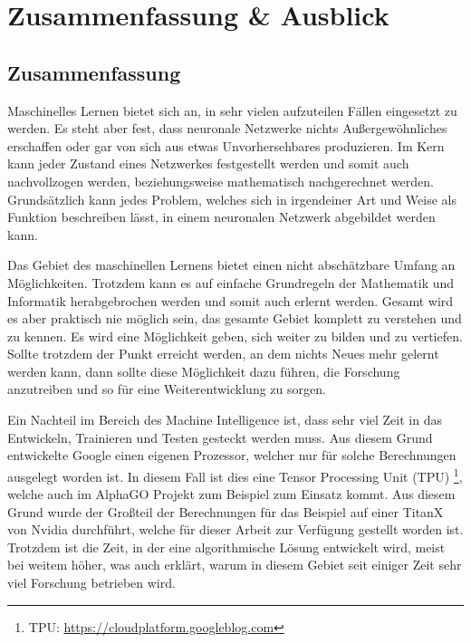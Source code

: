 \chapter{Zusammenfassung \& Ausblick}
\label{cha:ZusammenfassungAusblick}

\section{Zusammenfassung}

\noindent
Maschinelles Lernen bietet sich an, in sehr vielen aufzuteilen Fällen eingesetzt zu werden. 
Es steht aber fest, dass neuronale Netzwerke nichts Außergewöhnliches erschaffen oder gar von sich aus etwas Unvorhersehbares produzieren. 
Im Kern kann jeder Zustand eines Netzwerkes festgestellt werden und somit auch nachvollzogen werden, beziehungsweise mathematisch nachgerechnet werden. 
Grundsätzlich kann jedes Problem, welches sich in irgendeiner Art und Weise als Funktion beschreiben lässt, in einem neuronalen Netzwerk abgebildet werden kann. \newline

\noindent
Das Gebiet des maschinellen Lernens bietet einen nicht abschätzbare Umfang an Möglichkeiten. 
Trotzdem kann es auf einfache Grundregeln der Mathematik und Informatik herabgebrochen werden und somit auch erlernt werden. 
Gesamt wird es aber praktisch nie möglich sein, das gesamte Gebiet komplett zu verstehen und zu kennen.
Es wird eine Möglichkeit geben, sich weiter zu bilden und zu vertiefen. 
Sollte trotzdem der Punkt erreicht werden, an dem nichts Neues mehr gelernt werden kann, dann sollte diese Möglichkeit dazu führen, die Forschung anzutreiben und so für eine Weiterentwicklung zu sorgen. \newline

\noindent
Ein Nachteil im Bereich des Machine Intelligence ist, dass sehr viel Zeit in das Entwickeln, Trainieren und Testen gesteckt werden muss. 
Aus diesem Grund entwickelte Google einen eigenen Prozessor, welcher nur für solche Berechnungen ausgelegt worden ist. 
In diesem Fall ist dies eine Tensor Processing Unit (TPU) \footnote{TPU: \url{https://cloudplatform.googleblog.com}}, welche auch im AlphaGO Projekt zum Beispiel zum Einsatz kommt. 
Aus diesem Grund wurde der Großteil der Berechnungen für das Beispiel auf einer TitanX von Nvidia durchführt, welche für dieser Arbeit zur Verfügung gestellt worden ist. 
Trotzdem ist die Zeit, in der eine algorithmische Lösung entwickelt wird, meist bei weitem höher, was auch erklärt, warum in diesem Gebiet seit einiger Zeit sehr viel Forschung betrieben wird. 

